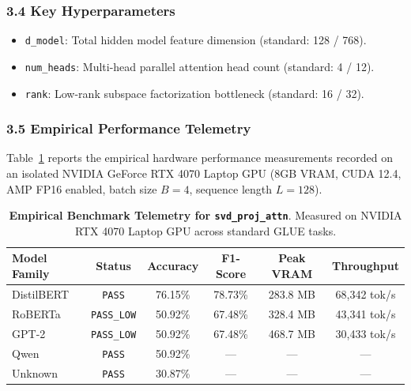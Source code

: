\subsubsection*{3.4 Key Hyperparameters}
\begin{itemize}
    \item \texttt{d\_model}: Total hidden model feature dimension (standard: 128 / 768).
    \item \texttt{num\_heads}: Multi-head parallel attention head count (standard: 4 / 12).
    \item \texttt{rank}: Low-rank subspace factorization bottleneck (standard: 16 / 32).
\end{itemize}

\subsubsection*{3.5 Empirical Performance Telemetry}
Table~\ref{tab:telemetry_svd_proj_attn} reports the empirical hardware performance measurements recorded on an isolated NVIDIA GeForce RTX 4070 Laptop GPU (8GB VRAM, CUDA 12.4, AMP FP16 enabled, batch size $B=4$, sequence length $L=128$).

\begin{table}[h]
\centering
\small
\caption{\textbf{Empirical Benchmark Telemetry for \texttt{svd\_proj\_attn}}. Measured on NVIDIA RTX 4070 Laptop GPU across standard GLUE tasks.}
\label{tab:telemetry_svd_proj_attn}
\begin{tabular*}{\columnwidth}{@{\extracolsep{\fill}}lccccc}
\toprule
\textbf{Model Family} & \textbf{Status} & \textbf{Accuracy} & \textbf{F1-Score} & \textbf{Peak VRAM} & \textbf{Throughput} \\
\midrule
DistilBERT & \texttt{PASS} & 76.15\% & 78.73\% & 283.8 MB & 68,342 tok/s \\
RoBERTa & \texttt{PASS\_LOW} & 50.92\% & 67.48\% & 328.4 MB & 43,341 tok/s \\
GPT-2 & \texttt{PASS\_LOW} & 50.92\% & 67.48\% & 468.7 MB & 30,433 tok/s \\
Qwen & \texttt{PASS} & 50.92\% & --- & --- & --- \\
Unknown & \texttt{PASS} & 30.87\% & --- & --- & --- \\
\bottomrule
\end{tabular*}
\end{table}

